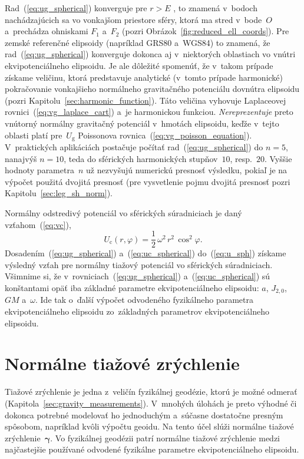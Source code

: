 \documentclass[a4paper, 12pt]{book}
\newcommand{\gidx}{\mathrm g}
\newcommand{\cidx}{\mathrm c}
\begin{document}
Rad~(\ref{eq:ug_spherical}) konverguje pre $r > E$ 
\parencite{MoritzAdvancedGeodesy}, to znamená v~bodoch nachádzajúcich sa vo 
vonkajšom priestore sféry, ktorá ma stred v~bode~$O$ a~prechádza ohniskami 
$F_1$ a~$F_2$ (pozri Obrázok~\ref{fig:reduced_ell_coords}).  Pre zemské 
referenčné elipsoidy (napríklad GRS80 a~WGS84) to znamená, že 
rad~(\ref{eq:ug_spherical}) konverguje dokonca aj v~niektorých oblastiach vo 
vnútri ekvipotenciálneho elipsoidu.  Je ale dôležité spomenúť, že v~takom 
prípade získame veličinu, ktorá predstavuje analytické (v~tomto prípade 
harmonické) pokračovanie vonkajšieho normálneho gravitačného potenciálu 
dovnútra elipsoidu (pozri Kapitolu~\ref{sec:harmonic_function}).  Táto veličina 
vyhovuje Laplaceovej rovnici~(\ref{eq:vg_laplace_cart}) a~je harmonickou 
funkciou.  \emph{Nereprezentuje} preto vnútorný normálny gravitačný potenciál 
v~hmotách elipsoidu, keďže v~tejto oblasti platí pre~$U_\gidx$ Poissonova 
rovnica~(\ref{eq:vg_poisson_equation}).  V~praktických aplikáciách postačuje 
počítať rad~(\ref{eq:ug_spherical}) do $n = 5$, nanajvýš $n = 10$, teda do 
sférických harmonických stupňov~$10$, resp.~$20$.  Vyššie hodnoty parametra~$n$ 
už nezvyšujú numerickú presnosť výsledku, pokiaľ je na výpočet použitá dvojitá 
presnosť (pre vysvetlenie pojmu dvojitá presnosť pozri 
Kapitolu~\ref{sec:leg_sh_norm}).

Normálny odstredivý potenciál vo sférických súradniciach je daný 
vzťahom~(\ref{eq:vc}),
%
\begin{equation}
\label{eq:uc_spherical}
U_\cidx(r, \varphi) = \frac{1}{2} \, \omega^2 \, r^2 \, \cos^2\varphi{.}
\end{equation}
%
Dosadením~(\ref{eq:ug_spherical}) a~(\ref{eq:uc_spherical}) do~(\ref{eq:u_sph}) 
získame výsledný vzťah pre normálny tiažový potenciál vo sférických 
súradniciach.  Všimnime si, že v~rovniciach~(\ref{eq:ug_spherical}) 
a~(\ref{eq:uc_spherical}) sú konštantami opäť iba základné parametre 
ekvipotenciálneho elipsoidu: $a$, $J_{2,0}$, $GM$ a~$\omega$.  Ide tak o~ďalší 
výpočet odvodeného fyzikálneho parametra ekvipotenciálneho elipsoidu 
zo~základných parametrov ekvipotenciálneho elipsoidu.



\section{Normálne tiažové zrýchlenie}
\label{sec:normal_gravity}

Tiažové zrýchlenie je jedna z~veličín fyzikálnej geodézie, ktorú je možné 
odmerať (Kapitola~\ref{sec:gravity_measurements}).  V~mnohých úlohách je preto 
výhodné či dokonca potrebné modelovať ho jednoduchým a~súčasne dostatočne 
presným spôsobom, napríklad kvôli výpočtu geoidu.  Na tento účel slúži normálne 
tiažové zrýchlenie~$\boldsymbol\gamma$.  Vo fyzikálnej geodézii patrí normálne 
tiažové zrýchlenie medzi najčastejšie používané odvodené fyzikálne parametre 
ekvipotenciálneho elipsoidu.
\end{document}
